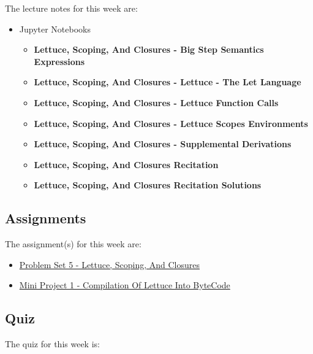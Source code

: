 \noindent The lecture notes for this week are:

\begin{itemize}
    \item Jupyter Notebooks
    \begin{itemize}
        \item \textbf{Lettuce, Scoping, And Closures - Big Step Semantics Expressions}
        \item \textbf{Lettuce, Scoping, And Closures - Lettuce - The Let Language}
        \item \textbf{Lettuce, Scoping, And Closures - Lettuce Function Calls}
        \item \textbf{Lettuce, Scoping, And Closures - Lettuce Scopes Environments}
        \item \textbf{Lettuce, Scoping, And Closures - Supplemental Derivations}
        \item \textbf{Lettuce, Scoping, And Closures Recitation}
        \item \textbf{Lettuce, Scoping, And Closures Recitation Solutions}
    \end{itemize}
\end{itemize}

\subsection{Assignments}

The assignment(s) for this week are:

\begin{itemize}
    \item \href{https://github.com/QuantumCompiler/CU/tree/main/CSPB%203155%20-%20Principles%20Of%20Programming%20Languages/Assignments/Problem%20Sets/Problem%20Set%205%20-%20Lettuce%2C%20Scoping%2C%20And%20Closures}{Problem Set 5 - Lettuce, Scoping, And Closures}
    \item \href{https://github.com/QuantumCompiler/CU/tree/main/CSPB%203155%20-%20Principles%20Of%20Programming%20Languages/Assignments/Mini%20Projects/Mini%20Project%201%20-%20Compilation%20Of%20Lettuce%20Into%20ByteCode}{Mini Project 1 - Compilation Of Lettuce Into ByteCode}
\end{itemize}

\subsection{Quiz}

The quiz for this week is:

